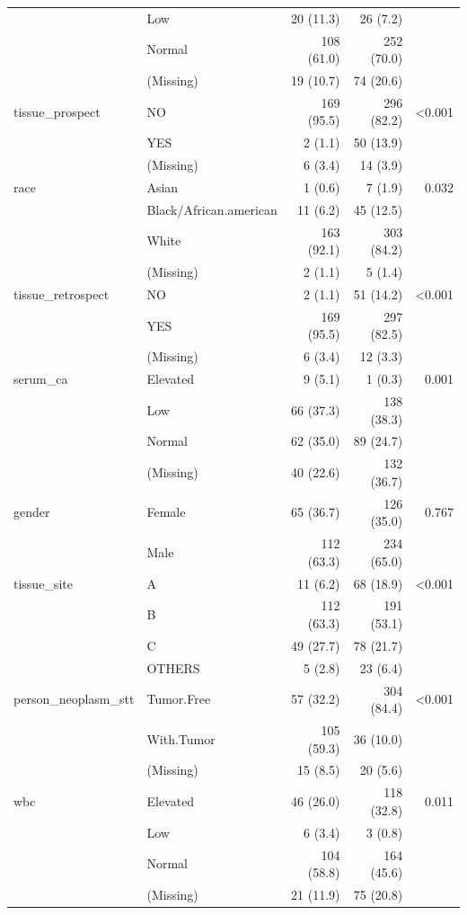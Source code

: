 \documentclass[]{article}
\begin{document}
\begin{longtable}[]{@{}llrrr@{}}
& Low & 20 (11.3) & 26 (7.2) &\tabularnewline
& Normal & 108 (61.0) & 252 (70.0) &\tabularnewline
& (Missing) & 19 (10.7) & 74 (20.6) &\tabularnewline
tissue\_prospect & NO & 169 (95.5) & 296 (82.2) &
\textless{}0.001\tabularnewline
& YES & 2 (1.1) & 50 (13.9) &\tabularnewline
& (Missing) & 6 (3.4) & 14 (3.9) &\tabularnewline
race & Asian & 1 (0.6) & 7 (1.9) & 0.032\tabularnewline
& Black/African.american & 11 (6.2) & 45 (12.5) &\tabularnewline
& White & 163 (92.1) & 303 (84.2) &\tabularnewline
& (Missing) & 2 (1.1) & 5 (1.4) &\tabularnewline
tissue\_retrospect & NO & 2 (1.1) & 51 (14.2) &
\textless{}0.001\tabularnewline
& YES & 169 (95.5) & 297 (82.5) &\tabularnewline
& (Missing) & 6 (3.4) & 12 (3.3) &\tabularnewline
serum\_ca & Elevated & 9 (5.1) & 1 (0.3) & 0.001\tabularnewline
& Low & 66 (37.3) & 138 (38.3) &\tabularnewline
& Normal & 62 (35.0) & 89 (24.7) &\tabularnewline
& (Missing) & 40 (22.6) & 132 (36.7) &\tabularnewline
gender & Female & 65 (36.7) & 126 (35.0) & 0.767\tabularnewline
& Male & 112 (63.3) & 234 (65.0) &\tabularnewline
tissue\_site & A & 11 (6.2) & 68 (18.9) &
\textless{}0.001\tabularnewline
& B & 112 (63.3) & 191 (53.1) &\tabularnewline
& C & 49 (27.7) & 78 (21.7) &\tabularnewline
& OTHERS & 5 (2.8) & 23 (6.4) &\tabularnewline
person\_neoplasm\_stt & Tumor.Free & 57 (32.2) & 304 (84.4) &
\textless{}0.001\tabularnewline
& With.Tumor & 105 (59.3) & 36 (10.0) &\tabularnewline
& (Missing) & 15 (8.5) & 20 (5.6) &\tabularnewline
wbc & Elevated & 46 (26.0) & 118 (32.8) & 0.011\tabularnewline
& Low & 6 (3.4) & 3 (0.8) &\tabularnewline
& Normal & 104 (58.8) & 164 (45.6) &\tabularnewline
& (Missing) & 21 (11.9) & 75 (20.8) &\tabularnewline
\bottomrule
\end{longtable}
\end{document}
